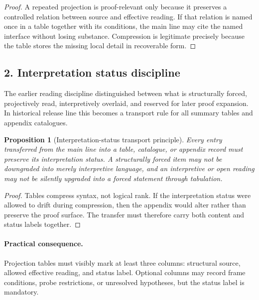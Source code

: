 \documentclass[12pt,a4paper]{article}
\DeclareRobustCommand{\QSCver}[1]{archival stage}
\newtheorem{proposition}[theorem]{Proposition}
\renewcommand{\QSCver}[1]{historical release line}
\begin{document}
\begin{proof}
A repeated projection is proof-relevant only because it preserves a controlled
relation between source and effective reading. If that relation is named once in
a table together with its conditions, the main line may cite the named interface
without losing substance. Compression is legitimate precisely because the table
stores the missing local detail in recoverable form.
\end{proof}

\subsection*{2. Interpretation status discipline}
The earlier reading discipline distinguished between what is structurally
forced, projectively read, interpretively overlaid, and reserved for later proof expansion. In
\QSCver{v1.5.0} this becomes a transport rule for all summary tables and appendix
catalogues.

\begin{proposition}[Interpretation-status transport principle]
\label{prop:interpretation-status-transport}
Every entry transferred from the main line into a table, catalogue, or appendix
record must preserve its interpretation status. A structurally forced item may
not be downgraded into merely interpretive language, and an interpretive or open reading may not
be silently upgraded into a forced statement through tabulation.
\end{proposition}

\begin{proof}
Tables compress syntax, not logical rank. If the interpretation status were
allowed to drift during compression, then the appendix would alter rather than
preserve the proof surface. The transfer must therefore carry both content and
status labels together.
\end{proof}

\paragraph{Practical consequence.}
Projection tables must visibly mark at least three columns: structural source,
allowed effective reading, and status label. Optional columns may record frame
conditions, probe restrictions, or unresolved hypotheses, but the status label
is mandatory.
\end{document}

